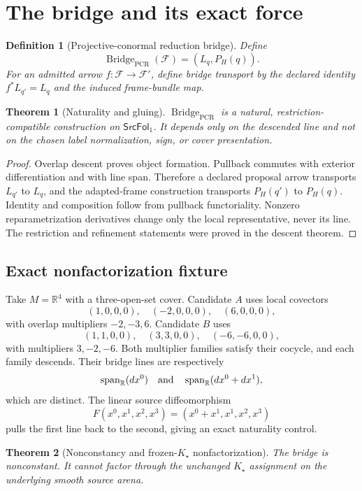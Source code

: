 \documentclass[11pt]{article}
\newtheorem{theorem}{Theorem}
\newtheorem{definition}{Definition}
\newcommand{\Kstar}{K_{\star}}
\newcommand{\Bridge}{\operatorname{Bridge}_{\mathrm{PCR}}}
\newcommand{\Span}{\operatorname{span}_{\mathbb R}}
\begin{document}
\section{The bridge and its exact force}

\begin{definition}[Projective-conormal reduction bridge]
Define
\[
 \Bridge(\mathcal F)=(L_q,P_H(q)).
\]
For an admitted arrow $f:\mathcal F\to\mathcal F'$, define bridge transport by
the declared identity $f^*L_{q'}=L_q$ and the induced frame-bundle map.
\end{definition}

\begin{theorem}[Naturality and gluing]
$\Bridge$ is a natural, restriction-compatible construction on
$\mathsf{SrcFol}_1$.  It depends only on the descended line and not on the
chosen label normalization, sign, or cover presentation.
\end{theorem}

\begin{proof}
Overlap descent proves object formation.  Pullback commutes with exterior
differentiation and with line span.  Therefore a declared proposal arrow
transports $L_{q'}$ to $L_q$, and the adapted-frame construction transports
$P_H(q')$ to $P_H(q)$.  Identity and composition follow from pullback
functoriality.  Nonzero reparametrization derivatives change only the local
representative, never its line.  The restriction and refinement statements
were proved in the descent theorem.
\end{proof}

\subsection{Exact nonfactorization fixture}

Take $M=\mathbb R^4$ with a three-open-set cover.  Candidate $A$ uses local
covectors
\[
 (1,0,0,0),\quad(-2,0,0,0),\quad(6,0,0,0),
\]
with overlap multipliers $-2,-3,6$.  Candidate $B$ uses
\[
 (1,1,0,0),\quad(3,3,0,0),\quad(-6,-6,0,0),
\]
with multipliers $3,-2,-6$.  Both multiplier families satisfy their cocycle,
and each family descends.  Their bridge lines are respectively
\[
 \Span(dx^0)\quad\hbox{and}\quad\Span(dx^0+dx^1),
\]
which are distinct.  The linear source diffeomorphism
\[
 F(x^0,x^1,x^2,x^3)=(x^0+x^1,x^1,x^2,x^3)
\]
pulls the first line back to the second, giving an exact naturality control.

\begin{theorem}[Nonconstancy and frozen-$\Kstar$ nonfactorization]
The bridge is nonconstant.  It cannot factor through the unchanged
$\Kstar$ assignment on the underlying smooth source arena.
\end{theorem}
\end{document}

